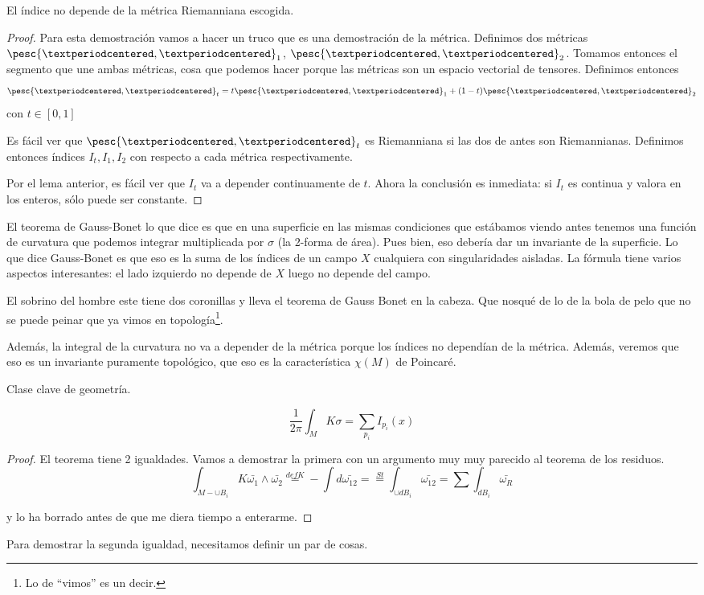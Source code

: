 \begin{lemma} El índice no depende de la métrica Riemanniana escogida.
\end{lemma}

\begin{proof} Para esta demostración vamos a hacer un truco que es una demostración de la métrica. Definimos dos métricas $\pesc{·,·}_1$, $\pesc{·,·}_2$. Tomamos entonces el segmento que une ambas métricas, cosa que podemos hacer porque las métricas son un espacio vectorial de tensores. Definimos entonces  \[ \pesc{·,·}_t = t \pesc{·,·}_1 + (1-t)\pesc{·,·}_2 \] con $t∈[0,1]$

Es fácil ver que $\pesc{·,·}_t$ es Riemanniana si las dos de antes son Riemannianas. Definimos entonces índices $I_t, I_1, I_2$ con respecto a cada métrica respectivamente.

Por el lema anterior, es fácil ver que $I_t$ va a depender continuamente de $t$. Ahora la conclusión es inmediata: si $I_t$ es continua y valora en los enteros, sólo puede ser constante.
\end{proof}

El teorema de Gauss-Bonet lo que dice es que en una superficie en las mismas condiciones que estábamos viendo antes tenemos una función de curvatura que podemos integrar multiplicada por $σ$ (la 2-forma de área). Pues bien, eso debería dar un invariante de la superficie. Lo que dice Gauss-Bonet es que eso es la suma de los índices de un campo $X$ cualquiera con singularidades aisladas. La fórmula tiene varios aspectos interesantes: el lado izquierdo no depende de $X$ luego no depende del campo.

El sobrino del hombre este tiene dos coronillas y lleva el teorema de Gauss Bonet en la cabeza. Que nosqué de lo de la bola de pelo que no se puede peinar que ya vimos en topología\footnote{Lo de ``vimos'' es un decir.}.

Además, la integral de la curvatura no va a depender de la métrica porque los índices no dependían de la métrica. Además, veremos que eso es un invariante puramente topológico, que eso es la característica $χ(M)$ de Poincaré.




Clase clave de geometría.

\begin{theorem}
\[\frac{1}{2π} \int_M Kσ = \sum_{p_i} I_{p_i}(x)\]

\end{theorem}

\begin{proof}

El teorema tiene 2 igualdades. Vamos a demostrar la primera con un argumento muy muy parecido al teorema de los residuos.
\[\int_{M-∪B_i} K\bar{ω_1} ∧ \bar{ω_2} \overset{defK}{=} -\int d\bar{ω_{12}} = \overset{St} = \int_{∪dB_i}\bar{ω_{12}} = \sum \int_{dB_i} \bar{ω_R} \]

y lo ha borrado antes de que me diera tiempo a enterarme.


\end{proof}
Para demostrar la segunda igualdad, necesitamos definir un par de cosas.



